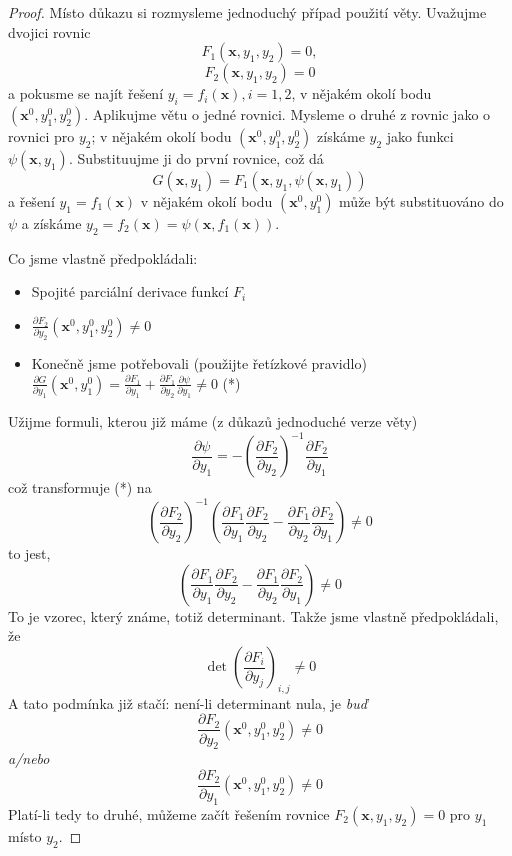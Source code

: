 \documentclass[../main.tex]{subfiles}
\begin{document}
\begin{proof}
	Místo důkazu si rozmysleme jednoduchý případ použití věty. Uvažujme
	dvojici rovnic
	$$
	F_1(\mathbf{x}, y_1, y_2) = 0,
	$$
	$$
	F_2(\mathbf{x}, y_1, y_2) = 0
	$$
	a pokusme se najít řešení $y_i = f_i(\mathbf{x}), i = 1, 2$, v nějakém
	okolí bodu $(\mathbf{x}^0, y_1^0, y_2^0)$. Aplikujme větu o jedné
	rovnici. Mysleme o druhé z rovnic jako o rovnici pro $y_2$; v nějakém
	okolí bodu $(\mathbf{x}^0, y_1^0, y_2^0)$ získáme $y_2$ jako funkci
	$\psi(\mathbf{x}, y_1)$. Substituujme ji do první rovnice, což dá
	$$
	G(\mathbf{x}, y_1) = F_1(\mathbf{x}, y_1, \psi(\mathbf{x}, y_1))
	$$
	a řešení $y_1 = f_1(\mathbf{x})$ v nějakém okolí bodu $(\mathbf{x}^0,
	y_1^0)$ může být substituováno do $\psi$ a získáme $y_2 =
	f_2(\mathbf{x}) = \psi(\mathbf{x}, f_1(\mathbf{x}))$.

	Co jsme vlastně předpokládali:
	\begin{itemize}
		\item Spojité parciální derivace funkcí $F_i$
		\item $\frac{\partial F_2}{\partial y_2} (\mathbf{x}^0, y_1^0,
			y_2^0) \neq 0$
		\item Konečně jsme potřebovali (použijte řetízkové pravidlo)
			$\frac{\partial G}{\partial y_1} (\mathbf{x}^0, y_1^0)
			= \frac{\partial F_1}{\partial y_1} + \frac{\partial
			F_1}{\partial y_2} \frac{\partial \psi}{\partial y_1}
			\neq 0$ (*)
	\end{itemize}
	Užijme formuli, kterou již máme (z důkazů jednoduché verze věty)
	$$
	\frac{\partial \psi}{\partial y_1} = - \left ( \frac{\partial
	F_2}{\partial y_2} \right )^{-1} \frac{\partial F_2}{\partial y_1}
	$$
	což transformuje (*) na
	$$
	\left ( \frac{\partial F_2}{\partial y_2} \right )^{-1} \left (
	\frac{\partial F_1}{\partial y_1} \frac{\partial F_2}{\partial y_2} -
	\frac{\partial F_1}{\partial y_2} \frac{\partial F_2}{\partial y_1}
	\right ) \neq 0
	$$
	to jest,
	$$
	\left (
	\frac{\partial F_1}{\partial y_1} \frac{\partial F_2}{\partial y_2} -
	\frac{\partial F_1}{\partial y_2} \frac{\partial F_2}{\partial y_1}
	\right ) \neq 0
	$$
	To je vzorec, který známe, totiž determinant. Takže jsme vlastně
	předpokládali, že
	$$
	\det \left ( \frac{\partial F_i}{\partial y_j} \right )_{i,j} \neq 0
	$$
	A tato podmínka již stačí: není-li determinant nula, je \emph{buď}
	$$
	\frac{\partial F_2}{\partial y_2} (\mathbf{x}^0, y_1^0, y_2^0) \neq 0
	$$
	\emph{a/nebo}
	$$
	\frac{\partial F_2}{\partial y_1} (\mathbf{x}^0, y_1^0, y_2^0) \neq 0
	$$
	Platí-li tedy to druhé, můžeme začít řešením rovnice $F_2(\mathbf{x},
	y_1, y_2) = 0$ pro $y_1$ místo $y_2$.
\end{proof}

\end{document}
